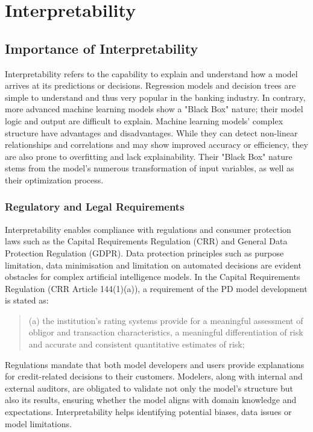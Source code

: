 \chapter{Interpretability}
\label{ch:IP}
\label{sec:interpret}

\section{Importance of Interpretability}
Interpretability refers to the capability to explain and understand how a model arrives at its predictions or decisions. Regression models and decision trees are simple to understand and thus very popular in the banking industry. In contrary, more advanced machine learning models show a "Black Box" nature; their model logic and output are difficult to explain. Machine learning models' complex structure have advantages and disadvantages. While they can detect non-linear relationships and correlations and may show improved accuracy or efficiency, they are also prone to overfitting and lack explainability. Their "Black Box" nature stems from the model's numerous transformation of input variables, as well as their optimization process. \cite[p.~56]{Roberts2022}

\subsection{Regulatory and Legal Requirements}
\label{sec:ref_leg}

Interpretability enables compliance with regulations and consumer protection laws such as the Capital Requirements Regulation (CRR) and General Data Protection Regulation (GDPR). Data protection principles such as purpose limitation, data minimisation and limitation on automated decisions are evident obstacles for complex artificial intelligence models. In the Capital Requirements Regulation (CRR Article 144(1)(a)), a requirement of the PD model development is stated as:

\begin{quote}

(a) the institution's rating systems provide for a meaningful assessment of obligor and transaction characteristics, a meaningful differentiation of risk and accurate and consistent quantitative estimates of risk;

\end{quote}

Regulations mandate that both model developers and users provide explanations for credit-related decisions to their customers. Modelers, along with internal and external auditors, are obligated to validate not only the model's structure but also its results, ensuring whether the model aligns with domain knowledge and expectations. Interpretability helps identifying potential biases, data issues or model limitations. 

